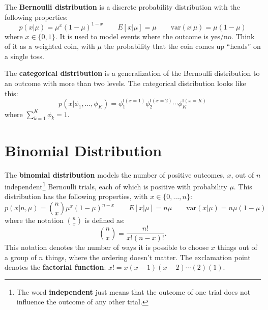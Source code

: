 The \textbf{Bernoulli distribution} is a discrete probability distribution with the following properties:
$$ p(x|\mu) = \mu^x (1 - \mu) ^ {1-x} \qquad E[x| \mu] = \mu \qquad \text{var}(x | \mu) = \mu (1 - \mu) $$
where $x \in \{0, 1\}$. It is used to model events where the outcome is yes/no. Think of it as a weighted coin, with $\mu$ the probability that the coin comes up ``heads'' on a single toss. 

The \textbf{categorical distribution} is a generalization of the Bernoulli distribution to an outcome with more than two levels. The categorical distribution looks like this:
$$ p(x|\phi_1, \dots, \phi_K) = \phi_1^{\mathbb{I}(x=1)} \phi_2^{\mathbb{I}(x=2)} \cdots \phi_K^{\mathbb{I}(x=K)} $$
where $\sum_{k=1}^K \phi_k = 1$.


\section{Binomial Distribution}

The \textbf{binomial distribution} models the number of positive outcomes, $x$, out of $n$ independent\footnote{The word \textbf{independent} just means that the outcome of one trial does not influence the outcome of any other trial.} Bernoulli trials, each of which is positive with probability $\mu$. This distribution has the following properties, with $x \in \{0, \dots, n\}$:
$$ p(x|n,\mu) = {n\choose x} \mu^x (1 - \mu) ^ {n-x} \qquad E[x| \mu] = n \mu \qquad \text{var}(x | \mu) = n \mu (1 - \mu) $$
where the notation ${n \choose x}$ is defined as:
$$ {n \choose x} = \frac{n!}{x!(n-x)!}. $$
This notation denotes the number of ways it is possible to choose $x$ things out of a group of $n$ things, where the ordering doesn't matter. The exclamation point denotes the \textbf{factorial function}: $x! = x(x-1)(x-2)\cdots(2)(1)$. 

